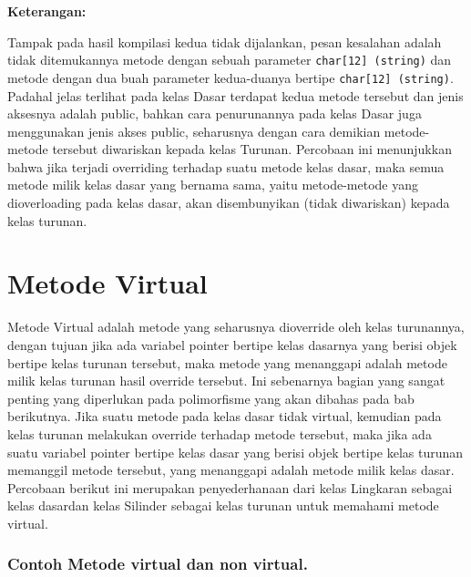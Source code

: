 \textbf{Keterangan:}

Tampak pada hasil kompilasi kedua tidak dijalankan, pesan kesalahan
adalah tidak ditemukannya metode dengan sebuah parameter
\texttt{char{[}12{]}\ (string)} dan metode dengan dua buah parameter
kedua-duanya bertipe \texttt{char{[}12{]}\ (string)}. Padahal jelas
terlihat pada kelas Dasar terdapat kedua metode tersebut dan jenis
aksesnya adalah public, bahkan cara penurunannya pada kelas Dasar juga
menggunakan jenis akses public, seharusnya dengan cara demikian
metode-metode tersebut diwariskan kepada kelas Turunan. Percobaan ini
menunjukkan bahwa jika terjadi overriding terhadap suatu metode kelas
dasar, maka semua metode milik kelas dasar yang bernama sama, yaitu
metode-metode yang dioverloading pada kelas dasar, akan disembunyikan
(tidak diwariskan) kepada kelas turunan.

\section{Metode Virtual}\label{metode-virtual}

Metode Virtual adalah metode yang seharusnya dioverride oleh kelas
turunannya, dengan tujuan jika ada variabel pointer bertipe kelas
dasarnya yang berisi objek bertipe kelas turunan tersebut, maka metode
yang menanggapi adalah metode milik kelas turunan hasil override
tersebut. Ini sebenarnya bagian yang sangat penting yang diperlukan pada
polimorfisme yang akan dibahas pada bab berikutnya. Jika suatu metode
pada kelas dasar tidak virtual, kemudian pada kelas turunan melakukan
override terhadap metode tersebut, maka jika ada suatu variabel pointer
bertipe kelas dasar yang berisi objek bertipe kelas turunan memanggil
metode tersebut, yang menanggapi adalah metode milik kelas dasar.
Percobaan berikut ini merupakan penyederhanaan dari kelas Lingkaran
sebagai kelas dasardan kelas Silinder sebagai kelas turunan untuk
memahami metode virtual.

\subsubsection*{Contoh  Metode virtual dan non virtual.}

